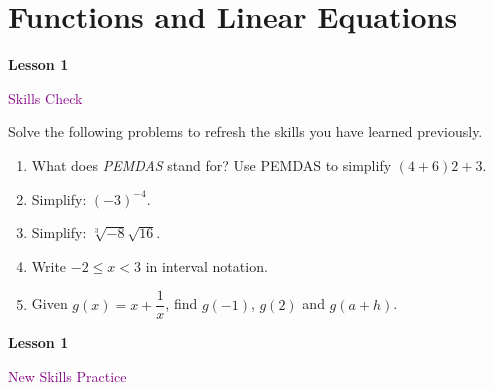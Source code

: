 \documentclass[10pt]{book}
\theoremstyle{definition}
\theoremstyle{remark}
\begin{document}
\section{Functions and Linear Equations}
\begin{tcolorbox}[
  width=\textwidth,
  colback=gray!10, %
  colframe=white, %
  boxrule=0pt,    %
  left=1cm,       %
  right=1cm,      %
  sharp corners  %
]

\begin{minipage}[t]{0.5\textwidth}
  \Huge \textbf{Lesson 1}
\end{minipage}%
\hfill
\begin{minipage}[t]{0.5\textwidth}
  \Huge \textcolor{purple}{Skills Check}
\end{minipage}
\end{tcolorbox}

\begin{large}
\noindent
Solve the following problems to refresh the skills you have learned previously.
\begin{enumerate}
\item What does \textit{PEMDAS} stand for? Use PEMDAS to simplify $(4+6)2+3$.\vfil \vfil \vfil
\item Simplify: $(-3)^{-4}$.\vfil \vfil \vfil
\item Simplify: $\sqrt[3]{-8}\sqrt{16}$.\vfil \vfil\vfil
\item Write $-2 \leq x < 3$ in interval notation. \vfil \vfil \vfil
\item Given $g(x) =x + \dfrac{1}{x}$, find $g(-1)$, $g(2)$ and $g(a+h)$.\vfil \vfil \vfil
\end{enumerate}
\end{large}
\newpage


\begin{tcolorbox}[
  width=\textwidth,
  colback=gray!10, %
  colframe=white, %
  boxrule=0pt,    %
  left=1cm,       %
  right=1cm,      %
  sharp corners  %
]

\begin{minipage}[t]{0.5\textwidth}
  \Huge \textbf{Lesson 1}
\end{minipage}%
\hfill
\begin{minipage}[t]{0.5\textwidth}
  \Huge\textcolor{purple}{New Skills Practice}
\end{minipage}
\end{tcolorbox}
\end{document}
